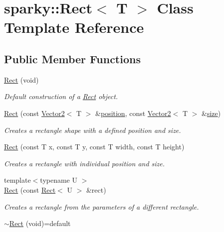 \hypertarget{classsparky_1_1_rect}{}\section{sparky\+:\+:Rect$<$ T $>$ Class Template Reference}
\label{classsparky_1_1_rect}
\subsection*{Public Member Functions}
\begin{DoxyCompactItemize}
\item 
\hyperlink{classsparky_1_1_rect_aaeb2ea225e3384e91174f5bc62e23f1e}{Rect} (void)
\begin{DoxyCompactList}\small\item\em Default construction of a \hyperlink{classsparky_1_1_rect}{Rect} object. \end{DoxyCompactList}\item 
\hyperlink{classsparky_1_1_rect_a125e1372a46f52bfba5fb67e10f98d32}{Rect} (const \hyperlink{classsparky_1_1_vector2}{Vector2}$<$ T $>$ \&\hyperlink{classsparky_1_1_rect_ab7d75c2c9b62522781d2b00cbbfe4472}{position}, const \hyperlink{classsparky_1_1_vector2}{Vector2}$<$ T $>$ \&\hyperlink{classsparky_1_1_rect_af70e69b176201d24d1883e1f5094c89a}{size})
\begin{DoxyCompactList}\small\item\em Creates a rectangle shape with a defined position and size. \end{DoxyCompactList}\item 
\hyperlink{classsparky_1_1_rect_a23cbea4c17a715d364ebce48f268abb6}{Rect} (const T x, const T y, const T width, const T height)
\begin{DoxyCompactList}\small\item\em Creates a rectangle with individual position and size. \end{DoxyCompactList}\item 
{\footnotesize template$<$typename U $>$ }\\\hyperlink{classsparky_1_1_rect_a233b31e4a38d7c3ae7ed707116a5c1d4}{Rect} (const \hyperlink{classsparky_1_1_rect}{Rect}$<$ U $>$ \&rect)
\begin{DoxyCompactList}\small\item\em Creates a rectangle from the parameters of a different rectangle. \end{DoxyCompactList}\item 
\hyperlink{classsparky_1_1_rect_adcbc933d37a23224bb6bb6e2c8793ead}{$\sim$\+Rect} (void)=default\hypertarget{classsparky_1_1_rect_adcbc933d37a23224bb6bb6e2c8793ead}{}\label{classsparky_1_1_rect_adcbc933d37a23224bb6bb6e2c8793ead}


\end{DoxyCompactItemize}
